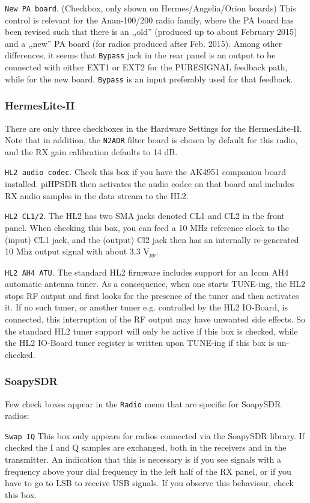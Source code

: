 \documentclass[12pt]{book}
\def\rett#1{\texttt{\color{red}#1}}
\def\bltt#1{\texttt{\color{blue}#1}}
\def\pH{pi\-HPSDR\xspace}
\begin{document}
\rett{New PA board}. (Checkbox, only shown on Hermes/Angelia/Orion boards)
This control is relevant for the Anan-100/200 radio family, where the PA board has
been revised such that there is an ,,old'' (produced up to about February 2015) and
a ,,new'' PA board (for radios produced after Feb. 2015). Among other differences,
it seems that  \bltt{Bypass} jack in the rear panel is an output to be connected
with either EXT1 or EXT2 for the PURESIGNAL feedback path, while for the
new board, \bltt{Bypass} is an input preferably used for that feedback.

\subsubsection{HermesLite-II}

There are only three checkboxes in the Hardware Settings for the HermesLite-II.
Note that in addition, the \bltt{N2ADR} filter board is chosen by default for this
radio, and the RX gain calibration defaults to 14 dB.

 \rett{HL2 audio codec}. Check this box if you have the AK4951 companion board installed.
  \pH then activates the audio codec on that board and includes RX audio samples in the
   data stream to the HL2.

 \rett{HL2 CL1/2}. The HL2 has two SMA jacks denoted CL1 and CL2 in the front panel. When checking this box,
 you can feed a 10 MHz reference clock to the (input) CL1 jack, and the (output) Cl2 jack then
 has an internally re-generated 10 Mhz output signal with about 3.3 V$_{pp}$.

\rett{HL2 AH4 ATU}. The standard HL2 firmware includes support for an Icom AH4 automatic antenna
tuner. As a consequence, when one starts TUNE-ing, the HL2 stops RF output and first looks
for the presence of the tuner and then activates it. If no such tuner, or another tuner
e.g. controlled by the HL2 IO-Board, is connected, this interruption of the RF output may have
unwanted side effects. So the standard HL2 tuner support will only be active if this box
is checked, while the HL2 IO-Board tuner register is written upon TUNE-ing if this box
is un-checked.

\subsubsection{SoapySDR}
Few check boxes appear in the \bltt{Radio} menu that are specific for SoapySDR radios:

\rett{Swap IQ} This box only appears for radios connected via the SoapySDR library. If checked
the I and Q samples are exchanged, both in the receivers and in the transmitter. An indication
that this is necessary is if you see signals with a frequency above your dial frequency in
the left half of the RX panel, or if you have to go to LSB to receive USB signals. If you
observe this behaviour, check this box.
\end{document}

